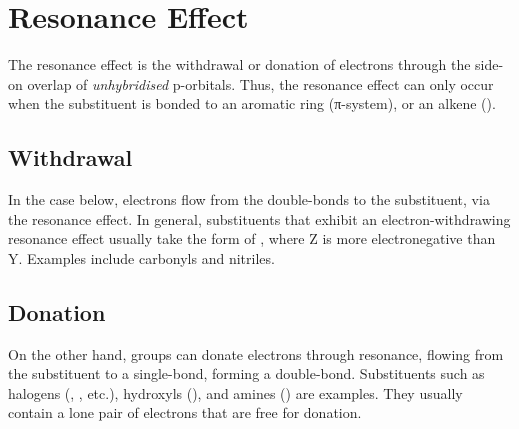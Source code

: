 	\section{Resonance Effect}

		The resonance effect is the withdrawal or donation of electrons through the side-on overlap of \textit{unhybridised} p-orbitals.
		Thus, the resonance effect can only occur when the substituent is bonded to an aromatic ring (π-system), or an alkene ().


		\subsection{Withdrawal}

			In the case below, electrons flow from the double-bonds to the substituent, via the resonance effect. In general, substituents
			that exhibit an electron-withdrawing resonance effect usually take the form of , where Z is more electronegative than Y.
			Examples include carbonyls and nitriles.




		\subsection{Donation}

			On the other hand, groups can donate electrons through resonance, flowing from the substituent to a single-bond, forming
			a double-bond. Substituents such as halogens (, \ch{\chlorine}, etc.), hydroxyls (), and amines ()
			are examples. They usually contain a lone pair of electrons that are free for donation.




